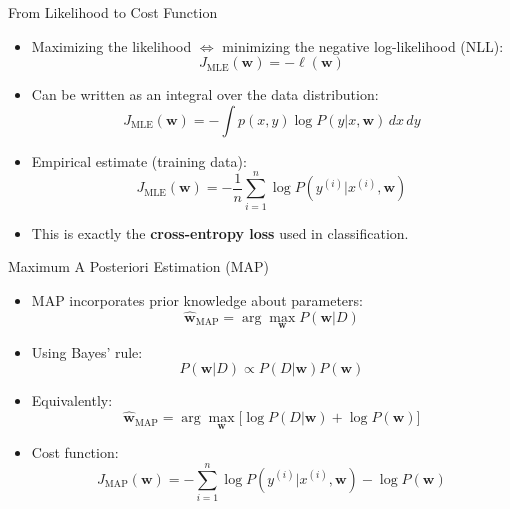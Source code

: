 \documentclass[serif, aspectratio=169]{beamer}
\begin{document}
    \begin{frame}{From Likelihood to Cost Function}
        \begin{itemize}
            \item Maximizing the likelihood $\Leftrightarrow$ minimizing the negative log-likelihood (NLL):
            \[
                J_{\text{MLE}}(\mathbf{w}) = -\ell(\mathbf{w})
            \]
            \item Can be written as an integral over the data distribution:
            \[
                J_{\text{MLE}}(\mathbf{w}) = - \int p(x,y) \log P(y|x, \mathbf{w}) \, dx\,dy
            \]
            \item Empirical estimate (training data):
            \[
                J_{\text{MLE}}(\mathbf{w}) = -\frac{1}{n}\sum_{i=1}^{n} \log P(y^{(i)}|x^{(i)}, \mathbf{w})
            \]
            \item This is exactly the \textbf{cross-entropy loss} used in classification.
        \end{itemize}
    \end{frame}

    \begin{frame}{Maximum A Posteriori Estimation (MAP)}
        \begin{itemize}
            \item MAP incorporates prior knowledge about parameters:
            \[
                \hat{\mathbf{w}}_{\text{MAP}} = \arg\max_{\mathbf{w}} P(\mathbf{w}|D)
            \]
            \item Using Bayes’ rule:
            \[
                P(\mathbf{w}|D) \propto P(D|\mathbf{w})P(\mathbf{w})
            \]
            \item Equivalently:
            \[
                \hat{\mathbf{w}}_{\text{MAP}} = \arg\max_{\mathbf{w}} \Big[ \log P(D|\mathbf{w}) + \log P(\mathbf{w}) \Big]
            \]
            \item Cost function:
            \[
                J_{\text{MAP}}(\mathbf{w}) = - \sum_{i=1}^n \log P(y^{(i)}|x^{(i)}, \mathbf{w}) - \log P(\mathbf{w})
            \]
        \end{itemize}
    \end{frame}
\end{document}
